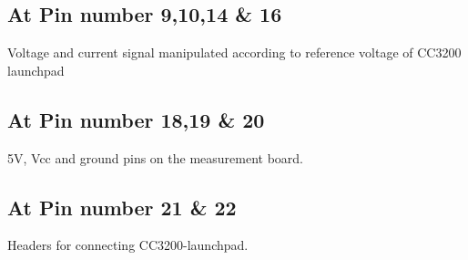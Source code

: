 \documentclass[a4paper,12pt,oneside]{book}
\begin{document}
\begin{appendices}
\subsection*{At Pin number 9,10,14 \& 16}
Voltage and current signal manipulated according to reference voltage of CC3200 launchpad \\

\subsection*{At Pin number 18,19 \& 20}
5V, Vcc and ground pins on the measurement board.  \\
\subsection*{At Pin number 21 \& 22}
Headers for connecting CC3200-launchpad. \\
\end{appendices}
\end{document}
